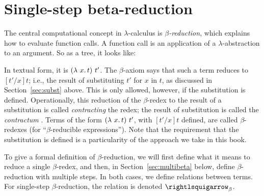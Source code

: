 \section{Single-step beta-reduction}
\label{sec:singlebeta}

The central computational concept in $\lambda$-calculus is
\emph{$\beta$-reduction}, which explains how to evaluate function
calls.  A function call is an application of a $\lambda$-abstraction
to an argument.  So as a tree, it looks like:
\begin{center}
\end{center}
\noindent In textual form, it is $(\lam{x}{t})\ t'$.  The
$\beta$-axiom says that such a term reduces to $[t'/x]t$; i.e., the
result of substituting $t'$ for $x$ in
$t$, as discussed in Section~\ref{sec:subst} above.  This is only
allowed, however, if the substitution is defined.  Operationally, this
reduction of the $\beta$-redex to the result of a substitution is
called \emph{contracting} the redex; the result of substitution is called
the \emph{contractum}
.  Terms of the
form $(\lam{x}{t})\ t'$, with $[t'/x]t$ defined, are called
$\beta$-redexes (for ``$\beta$-reducible
expressions'').  Note that the requirement that
the substitution is defined is a particularity of the approach we take
in this book.

To give a formal definition of $\beta$-reduction, we will first define
what it means to reduce a single $\beta$-redex, and then, in
Section~\ref{sec:multibeta} below, define $\beta$-reduction with
multiple steps.  In both cases, we define relations between terms.  For
single-step $\beta$-reduction, the relation is denoted $\curva_\beta$.

